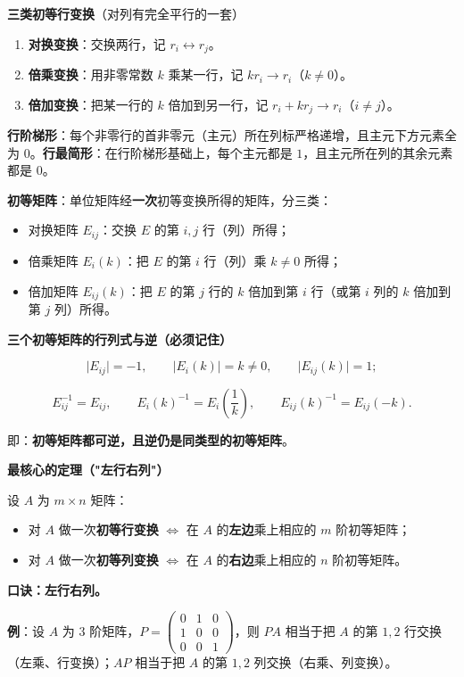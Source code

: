 \documentclass[11pt,openany,UTF8]{ctexbook}
\begin{document}
\textbf{三类初等行变换}（对列有完全平行的一套）

\begin{enumerate}
\item \textbf{对换变换}：交换两行，记 $r_i\leftrightarrow r_j$。
\item \textbf{倍乘变换}：用非零常数 $k$ 乘某一行，记 $kr_i\to r_i$（$k\ne0$）。
\item \textbf{倍加变换}：把某一行的 $k$ 倍加到另一行，记 $r_i+kr_j\to r_i$（$i\ne j$）。
\end{enumerate}
\textbf{行阶梯形}：每个非零行的首非零元（主元）所在列标严格递增，且主元下方元素全为 $0$。\textbf{行最简形}：在行阶梯形基础上，每个主元都是 $1$，且主元所在列的其余元素都是 $0$。

\textbf{初等矩阵}：单位矩阵经\textbf{一次}初等变换所得的矩阵，分三类：

\begin{itemize}
\item 对换矩阵 $E_{ij}$：交换 $E$ 的第 $i,j$ 行（列）所得；
\item 倍乘矩阵 $E_i(k)$：把 $E$ 的第 $i$ 行（列）乘 $k\ne0$ 所得；
\item 倍加矩阵 $E_{ij}(k)$：把 $E$ 的第 $j$ 行的 $k$ 倍加到第 $i$ 行（或第 $i$ 列的 $k$ 倍加到第 $j$ 列）所得。
\end{itemize}
\textbf{三个初等矩阵的行列式与逆（必须记住）}

\[\vert E_{ij}\vert=-1,\qquad \vert E_i(k)\vert=k\ne0,\qquad \vert E_{ij}(k)\vert=1;\]

\[E_{ij}^{-1}=E_{ij},\qquad E_i(k)^{-1}=E_i\left(\frac{1}{k}\right),\qquad E_{ij}(k)^{-1}=E_{ij}(-k).\]

即：\textbf{初等矩阵都可逆，且逆仍是同类型的初等矩阵}。

\textbf{最核心的定理（"左行右列"）}

设 $A$ 为 $m\times n$ 矩阵：

\begin{itemize}
\item 对 $A$ 做一次\textbf{初等行变换} $\iff$ 在 $A$ 的\textbf{左边}乘上相应的 $m$ 阶初等矩阵；
\item 对 $A$ 做一次\textbf{初等列变换} $\iff$ 在 $A$ 的\textbf{右边}乘上相应的 $n$ 阶初等矩阵。
\end{itemize}
\textbf{口诀：左行右列。}

\textbf{例}：设 $A$ 为 $3$ 阶矩阵，$P=\begin{pmatrix}0&1&0\\1&0&0\\0&0&1\end{pmatrix}$，则 $PA$ 相当于把 $A$ 的第 $1,2$ 行交换（左乘、行变换）；$AP$ 相当于把 $A$ 的第 $1,2$ 列交换（右乘、列变换）。
\end{document}

